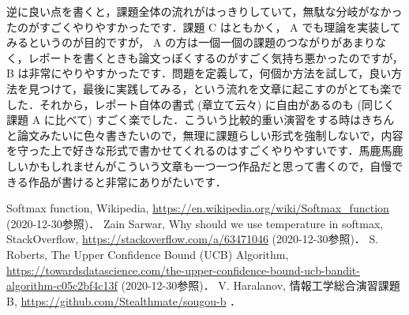 \documentclass{jsarticle}
\begin{document}
逆に良い点を書くと，課題全体の流れがはっきりしていて，無駄な分岐がなかったのがすごくやりやすかったです．課題 C はともかく， A でも理論を実装してみるというのが目的ですが， A の方は一個一個の課題のつながりがあまりなく，レポートを書くときも論文っぽくするのがすごく気持ち悪かったのですが， B は非常にやりやすかったです．問題を定義して，何個か方法を試して，良い方法を見つけて，最後に実践してみる，という流れを文章に起こすのがとても楽でした．それから，レポート自体の書式 (章立て云々) に自由があるのも (同じく課題 A に比べて) すごく楽でした．こういう比較的重い演習をする時はきちんと論文みたいに色々書きたいので，無理に課題らしい形式を強制しないで，内容を守った上で好きな形式で書かせてくれるのはすごくやりやすいです．馬鹿馬鹿しいかもしれませんがこういう文章も一つ一つ作品だと思って書くので，自慢できる作品が書けると非常にありがたいです．

\begin{thebibliography}{9}
 Softmax function, Wikipedia, \url{https://en.wikipedia.org/wiki/Softmax_function} (2020-12-30参照)．
 Zain Sarwar, Why should we use temperature in softmax, StackOverflow, \url{https://stackoverflow.com/a/63471046} (2020-12-30参照)．
 S. Roberts, The Upper Confidence Bound (UCB) Algorithm, \\\url{https://towardsdatascience.com/the-upper-confidence-bound-ucb-bandit-algorithm-c05c2bf4c13f} (2020-12-30参照)．
 V. Haralanov, 情報工学総合演習課題 B, \url{https://github.com/Stealthmate/sougou-b} ．
\end{thebibliography}
\end{document}
